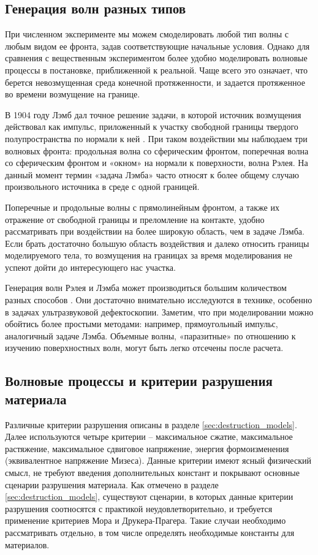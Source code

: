 \clearpage
\newpage


\subsection{Генерация волн разных типов}

При численном эксперименте мы можем смоделировать любой тип волны с любым видом ее фронта, задав соответствующие начальные условия. Однако для сравнения с вещественным экспериментом более удобно моделировать волновые процессы в постановке, приближенной к реальной. Чаще всего это означает, что берется невозмущенная среда конечной протяженности, и задается протяженное во времени возмущение на границе.

В 1904 году Лэмб дал точное решение задачи, в которой источник возмущения действовал как импульс, приложенный к участку свободной границы твердого полупространства по нормали к ней \cite{lamb}. При таком воздействии мы наблюдаем три волновых фронта: продольная волна со сферическим фронтом, поперечная волна со сферическим фронтом и «окном» на нормали к поверхности, волна Рэлея. На данный момент термин «задача Лэмба» часто относят к более общему случаю произвольного источника в среде с одной границей.

Поперечные и продольные волны с прямолинейным фронтом, а также их отражение от свободной границы и преломление на контакте, удобно рассматривать при воздействии на более широкую область, чем в задаче Лэмба. Если брать достаточно большую область воздействия и далеко относить границы моделируемого тела, то возмущения на границах за время моделирования не успеют дойти до интересующего нас участка.

Генерация волн Рэлея и Лэмба может производиться большим количеством разных способов \cite{viktorov}. Они достаточно внимательно исследуются в технике, особенно в задачах ультразвуковой дефектоскопии. Заметим, что при моделировании можно обойтись более простыми методами: например, прямоугольный импульс, аналогичный задаче Лэмба. Объемные волны, «паразитные» по отношению к изучению поверхностных волн, могут быть легко отсечены после расчета.

\clearpage
\newpage


\subsection{Волновые процессы и критерии разрушения материала}

Различные критерии разрушения описаны в разделе \ref{sec:destruction_models}. Далее используются четыре критерии -- максимальное сжатие, максимальное растяжение, максимальное сдвиговое напряжение, энергия формоизменения (эквивалентное напряжение Мизеса). Данные критерии имеют ясный физический смысл, не требуют введения дополнительных констант и покрывают основные сценарии разрушения материала. Как отмечено в разделе \ref{sec:destruction_models}, существуют сценарии, в которых данные критерии разрушения соотносятся с практикой неудовлетворительно, и требуется применение критериев Мора и Друкера-Прагера. Такие случаи необходимо рассматривать отдельно, в том числе определять необходимые константы для материалов.


